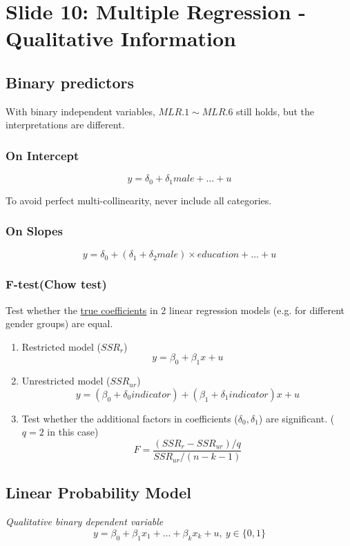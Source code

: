 \documentclass[]{article}
\begin{document}
	\section{Slide 10: Multiple Regression - Qualitative Information}
		\subsection{Binary predictors}
			\begin{remark}
				With binary independent variables, $MLR.1 \sim MLR.6$ still holds, but the interpretations are different.
			\end{remark}
			
			\subsubsection{On Intercept}
			\[
				y = \delta_0 + \delta_1 male + \dots + u
			\]
			\begin{remark}
				To avoid perfect multi-collinearity, never include all categories.
			\end{remark}
			
			\subsubsection{On Slopes}
			\[
				y = \delta_0 + (\delta_1 + \delta_2 male)\times education + \dots + u
			\]
			
			\subsubsection{F-test(Chow test)}
			\par Test whether the \ul{true coefficients} in 2 linear regression models (e.g. for different gender groups) are equal. 
			\begin{enumerate}
				\item Restricted model ($SSR_r$) \[y = \beta_0 + \beta_1 x + u \]
				\item Unrestricted model ($SSR_{ur}$) \[y = (\beta_0 + \delta_0 indicator) + (\beta_1 + \delta_1 indicator) x + u\]
				\item Test whether the additional factors in coefficients ($\delta_0, \delta_1$) are significant. ($q=2$ in this case)
				\[
					F = \frac{(SSR_{r} - SSR_{ur})/q}{SSR_{ur}/(n-k-1)}
				\]
			\end{enumerate}
		\subsection{Linear Probability Model}
			\emph{Qualitative binary dependent variable}
			\[
				y = \beta_0 + \beta_1 x_1 + \dots + \beta_k x_k + u,\ y \in \{0, 1\}
			\]
\end{document}

